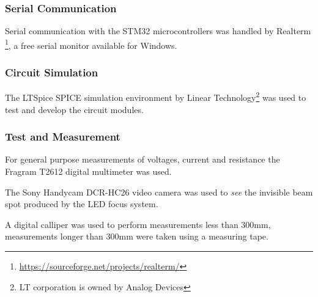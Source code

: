 \subsubsection{Serial Communication}
Serial communication with the STM32 microcontrollers was handled by Realterm \footnote{\url{https://sourceforge.net/projects/realterm/}}, a free serial monitor available for Windows.

\subsubsection{Circuit Simulation}
The LTSpice SPICE simulation environment by Linear Technology\footnote{LT corporation is owned by Analog Devices} was used to test and develop the circuit modules.

\subsubsection{Test and Measurement}
For general purpose measurements of voltages, current and resistance the Fragram T2612 digital multimeter was used.

The Sony Handycam DCR-HC26 video camera was used to \textit{see} the invisible beam spot produced by the LED focus system.

A digital calliper was used to perform measurements less than 300mm, measurements longer than 300mm were taken using a measuring tape.





